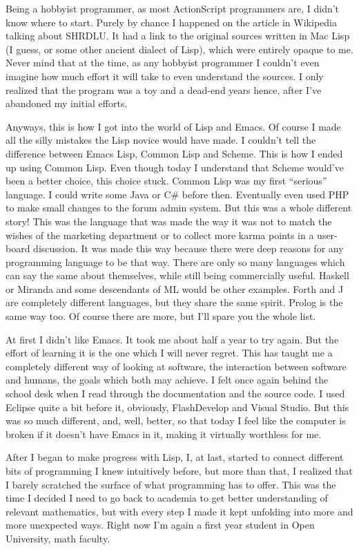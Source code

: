 \documentclass[oneside]{memoir}
\begin{document}
Being a hobbyist programmer, as most ActionScript programmers are, I didn't
know where to start.  Purely by chance I happened on the article in Wikipedia
talking about SHRDLU.  It had a link to the original sources written in Mac
Lisp (I guess, or some other ancient dialect of Lisp), which were entirely
opaque to me.  Never mind that at the time, as any hobbyist programmer I
couldn't even imagine how much effort it will take to even understand the
sources.  I only realized that the program was a toy and a dead-end years
hence, after I've abandoned my initial efforts.

Anyways, this is how I got into the world of Lisp and Emacs.  Of course I made
all the silly mistakes the Lisp novice would have made.  I couldn't tell the
difference between Emacs Lisp, Common Lisp and Scheme.  This is how I ended up
using Common Lisp.  Even though today I understand that Scheme would've been a
better choice, this choice stuck.  Common Lisp was my first ``serious''
language.  I could write some Java or C\# before then.  Eventually even used
PHP to make small changes to the forum admin system.  But this was a whole
different story!  This was the language that was made the way it was not to
match the wishes of the marketing department or to collect more karma points
in a user-board discussion.  It was made this way because there were deep
reasons for any programming language to be that way.  There are only so many
languages which can say the same about themselves, while still being
commercially useful.  Haskell or Miranda and some descendants of ML would be
other examples. Forth and J are completely different languages, but they share
the same spirit.  Prolog is the same way too.  Of course there are more, but
I'll spare you the whole list.

At first I didn't like Emacs.  It took me about half a year to try again.  But
the effort of learning it is the one which I will never regret.  This has
taught me a completely different way of looking at software, the interaction
between software and humans, the goals which both may achieve.  I felt once
again behind the school desk when I read through the documentation and the
source code.  I used Eclipse quite a bit before it, obviously, FlashDevelop
and Visual Studio.  But this was so much different, and, well, better, so that
today I feel like the computer is broken if it doesn't have Emacs in it,
making it virtually worthless for me.

After I began to make progress with Lisp, I, at last, started to connect
different bits of programming I knew intuitively before, but more than that, I
realized that I barely scratched the surface of what programming has to offer.
This was the time I decided I need to go back to academia to get better
understanding of relevant mathematics, but with every step I made it kept
unfolding into more and more unexpected ways.  Right now I'm again a first
year student in Open University, math faculty.
\end{document}
